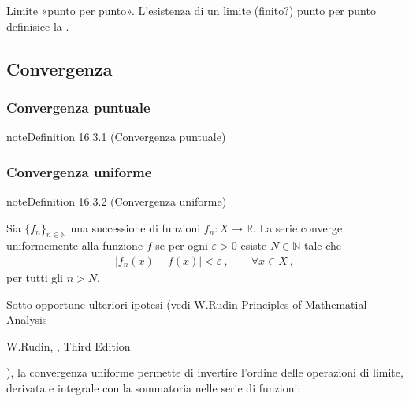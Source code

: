\documentclass[letterpaper,10pt,italian]{jupyterBook}
\begin{document}
\sphinxAtStartPar
{} Limite «punto per punto». L’esistenza di un limite (finito?) punto per punto definisice la {\hyperref[\detokenize{ch/series:math-hs-series-fun-sequences-convergence-point}]{}}.


\subsection{Convergenza}
\label{\detokenize{ch/series:convergenza}}\label{\detokenize{ch/series:math-hs-series-fun-sequences-convergence}}

\subsubsection{Convergenza puntuale}
\label{\detokenize{ch/series:convergenza-puntuale}}\label{\detokenize{ch/series:math-hs-series-fun-sequences-convergence-point}}\label{ch/series:definition-0}
\begin{sphinxadmonition}{note}{Definition 16.3.1 (Convergenza puntuale)}


\end{sphinxadmonition}


\subsubsection{Convergenza uniforme}
\label{\detokenize{ch/series:convergenza-uniforme}}\label{\detokenize{ch/series:math-hs-series-fun-sequences-convergence-uniform}}\label{ch/series:definition-1}
\begin{sphinxadmonition}{note}{Definition 16.3.2 (Convergenza uniforme)}



\sphinxAtStartPar
Sia \(\{ f_n \}_{n \in \mathbb{N}}\) una successione di funzioni \(f_n:  X \rightarrow \mathbb{R}\). La serie converge uniformemente alla funzione \(f\) se per ogni \(\varepsilon > 0\) esiste \(N \in \mathbb{N}\) tale che
\begin{equation*}
\begin{split}|f_n(x) - f(x)| < \varepsilon \ , \qquad \forall x \in X \ ,\end{split}
\end{equation*}
\sphinxAtStartPar
per tutti gli \(n > N\).
\end{sphinxadmonition}

\sphinxAtStartPar
{} Sotto opportune ulteriori ipotesi (vedi W.Rudin Principles of Mathematial Analysis%
\begin{footnote}[1]\sphinxAtStartFootnote
W.Rudin, , Third Edition
%
\end{footnote}), la convergenza uniforme permette di invertire l’ordine delle operazioni di limite, derivata e integrale con la sommatoria nelle serie di funzioni:
\end{document}
